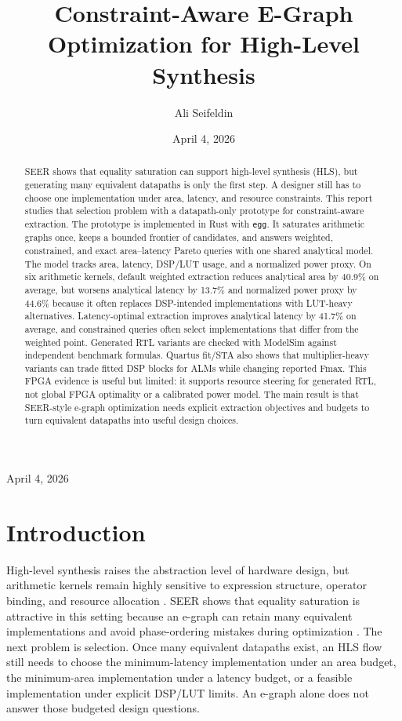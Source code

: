 \documentclass[sigplan,10pt,review]{acmart}
\begin{document}
\title{Constraint-Aware E-Graph Optimization for High-Level Synthesis}
\author{Ali Seifeldin}
\date{April 4, 2026}

\begin{abstract}
SEER shows that equality saturation can support high-level synthesis (HLS), but generating many equivalent datapaths is only the first step. A designer still has to choose one implementation under area, latency, and resource constraints. This report studies that selection problem with a datapath-only prototype for constraint-aware extraction. The prototype is implemented in Rust with \texttt{egg}. It saturates arithmetic graphs once, keeps a bounded frontier of candidates, and answers weighted, constrained, and exact area--latency Pareto queries with one shared analytical model. The model tracks area, latency, DSP/LUT usage, and a normalized power proxy. On six arithmetic kernels, default weighted extraction reduces analytical area by 40.9\% on average, but worsens analytical latency by 13.7\% and normalized power proxy by 44.6\% because it often replaces DSP-intended implementations with LUT-heavy alternatives. Latency-optimal extraction improves analytical latency by 41.7\% on average, and constrained queries often select implementations that differ from the weighted point. Generated RTL variants are checked with ModelSim against independent benchmark formulas. Quartus fit/STA also shows that multiplier-heavy variants can trade fitted DSP blocks for ALMs while changing reported Fmax. This FPGA evidence is useful but limited: it supports resource steering for generated RTL, not global FPGA optimality or a calibrated power model. The main result is that SEER-style e-graph optimization needs explicit extraction objectives and budgets to turn equivalent datapaths into useful design choices.
\end{abstract}

\maketitle
\begin{center}
\small April 4, 2026
\end{center}

\section{Introduction}
High-level synthesis raises the abstraction level of hardware design, but arithmetic kernels remain highly sensitive to expression structure, operator binding, and resource allocation \cite{cong2011hls}. SEER shows that equality saturation is attractive in this setting because an e-graph can retain many equivalent implementations and avoid phase-ordering mistakes during optimization \cite{cheng2024seer}. The next problem is selection. Once many equivalent datapaths exist, an HLS flow still needs to choose the minimum-latency implementation under an area budget, the minimum-area implementation under a latency budget, or a feasible implementation under explicit DSP/LUT limits. An e-graph alone does not answer those budgeted design questions.
\end{document}
